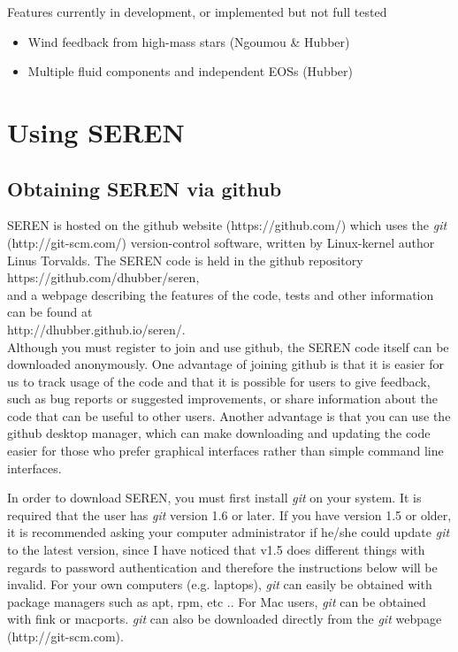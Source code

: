 \documentclass[a4paper]{article}
\begin{document}
\noindent Features currently in development, or implemented but not full tested
\begin{itemize}
\item Wind feedback from high-mass stars (Ngoumou \& Hubber)
\item Multiple fluid components and independent EOSs (Hubber)
\end{itemize}


\newpage


\section{Using SEREN }


\subsection{Obtaining SEREN via github}
SEREN is hosted on the github website ({\rm https://github.com/}) which uses the {\it git} ({\rm http://git-scm.com/}) version-control software, written by Linux-kernel author Linus Torvalds.  The SEREN code is held in the github repository \\

{\rm https://github.com/dhubber/seren}, \\  

\noindent and a webpage describing the features of the code, tests and other information can be found at \\

{\rm http://dhubber.github.io/seren/}. \\

\noindent Although you must register to join and use github, the SEREN code itself can be downloaded anonymously.  One advantage of joining github is that it is easier for us to track usage of the code and that it is possible for users to give feedback, such as bug reports or suggested improvements, or share information about the code that can be useful to other users.  Another advantage is that you can use the github desktop manager, which can make downloading and updating the code easier for those who prefer graphical interfaces rather than simple command line interfaces.

In order to download SEREN, you must first install {\it git} on your system.  It is required that the user has {\it git} version 1.6 or later.  If you have version 1.5 or older, it is recommended asking your computer administrator if he/she could update {\it git} to the latest version, since I have noticed that v1.5 does different things with regards to password authentication and therefore the instructions below will be invalid.  For your own computers (e.g. laptops), {\it git} can easily be obtained with package managers such as apt, rpm, etc ..   For Mac users, {\it git} can be obtained with fink or macports.  {\it git} can also be downloaded directly from the {\it git} webpage (http://git-scm.com).
\end{document}
